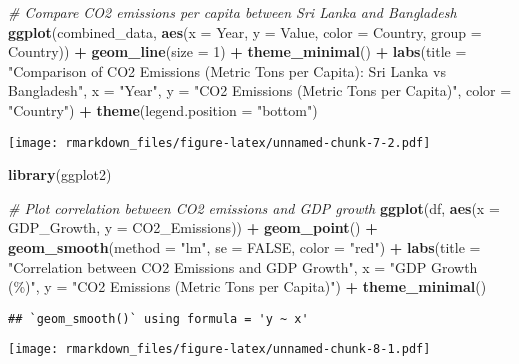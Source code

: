 \documentclass[
]{article}
\newenvironment{Shaded}{\begin{snugshade}}{\end{snugshade}}
\newcommand{\AttributeTok}[1]{\textcolor[rgb]{0.13,0.29,0.53}{#1}}
\newcommand{\CommentTok}[1]{\textcolor[rgb]{0.56,0.35,0.01}{\textit{#1}}}
\newcommand{\ConstantTok}[1]{\textcolor[rgb]{0.56,0.35,0.01}{#1}}
\newcommand{\DecValTok}[1]{\textcolor[rgb]{0.00,0.00,0.81}{#1}}
\newcommand{\FunctionTok}[1]{\textcolor[rgb]{0.13,0.29,0.53}{\textbf{#1}}}
\newcommand{\NormalTok}[1]{#1}
\newcommand{\SpecialCharTok}[1]{\textcolor[rgb]{0.81,0.36,0.00}{\textbf{#1}}}
\newcommand{\StringTok}[1]{\textcolor[rgb]{0.31,0.60,0.02}{#1}}
\begin{document}
\begin{Shaded}
\begin{Highlighting}[]
\CommentTok{\# Compare CO2 emissions per capita between Sri Lanka and Bangladesh}
\FunctionTok{ggplot}\NormalTok{(combined\_data, }\FunctionTok{aes}\NormalTok{(}\AttributeTok{x =}\NormalTok{ Year, }\AttributeTok{y =}\NormalTok{ Value, }\AttributeTok{color =}\NormalTok{ Country, }\AttributeTok{group =}\NormalTok{ Country)) }\SpecialCharTok{+}
  \FunctionTok{geom\_line}\NormalTok{(}\AttributeTok{size =} \DecValTok{1}\NormalTok{) }\SpecialCharTok{+}  
  \FunctionTok{theme\_minimal}\NormalTok{() }\SpecialCharTok{+}
  \FunctionTok{labs}\NormalTok{(}\AttributeTok{title =} \StringTok{"Comparison of CO2 Emissions (Metric Tons per Capita): Sri Lanka vs Bangladesh"}\NormalTok{,}
       \AttributeTok{x =} \StringTok{"Year"}\NormalTok{,}
       \AttributeTok{y =} \StringTok{"CO2 Emissions (Metric Tons per Capita)"}\NormalTok{,}
       \AttributeTok{color =} \StringTok{"Country"}\NormalTok{) }\SpecialCharTok{+}
  \FunctionTok{theme}\NormalTok{(}\AttributeTok{legend.position =} \StringTok{"bottom"}\NormalTok{)}
\end{Highlighting}
\end{Shaded}

\texttt{[image: rmarkdown\_files/figure-latex/unnamed-chunk-7-2.pdf]}

\begin{Shaded}
\begin{Highlighting}[]
\FunctionTok{library}\NormalTok{(ggplot2)}

\CommentTok{\# Plot correlation between CO2 emissions and GDP growth}
\FunctionTok{ggplot}\NormalTok{(df, }\FunctionTok{aes}\NormalTok{(}\AttributeTok{x =}\NormalTok{ GDP\_Growth, }\AttributeTok{y =}\NormalTok{ CO2\_Emissions)) }\SpecialCharTok{+}
  \FunctionTok{geom\_point}\NormalTok{() }\SpecialCharTok{+}
  \FunctionTok{geom\_smooth}\NormalTok{(}\AttributeTok{method =} \StringTok{"lm"}\NormalTok{, }\AttributeTok{se =} \ConstantTok{FALSE}\NormalTok{, }\AttributeTok{color =} \StringTok{"red"}\NormalTok{) }\SpecialCharTok{+}
  \FunctionTok{labs}\NormalTok{(}\AttributeTok{title =} \StringTok{"Correlation between CO2 Emissions and GDP Growth"}\NormalTok{,}
       \AttributeTok{x =} \StringTok{"GDP Growth (\%)"}\NormalTok{,}
       \AttributeTok{y =} \StringTok{"CO2 Emissions (Metric Tons per Capita)"}\NormalTok{) }\SpecialCharTok{+}
  \FunctionTok{theme\_minimal}\NormalTok{()}
\end{Highlighting}
\end{Shaded}

\begin{verbatim}
## `geom_smooth()` using formula = 'y ~ x'
\end{verbatim}

\texttt{[image: rmarkdown\_files/figure-latex/unnamed-chunk-8-1.pdf]}
\end{document}
